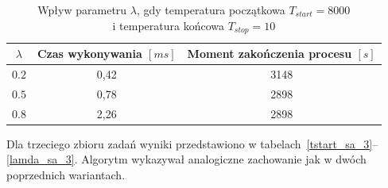 \begin{table}[H]
	\centering
	\caption{Wpływ parametru $\lambda$, gdy temperatura początkowa $T_{start}=8000$\\i temperatura końcowa $T_{stop}=10$}
	\label{lamda_sa_2}
	\begin{tabular}{ccc}
		\toprule
		$\lambda$ & Czas wykonywania $[ms]$ & Moment zakończenia procesu $[s]$ \\
		\midrule
		$0.2$     & 0,42                    & 3148                              \\
		$0.5$     & 0,78                    & 2898                              \\
		$0.8$     & 2,26                    & 2898                              \\
		\bottomrule
	\end{tabular}
\end{table}

\breakparagraph{}
Dla trzeciego zbioru zadań wyniki przedstawiono w tabelach~\ref{tstart_sa_3}--\ref{lamda_sa_3}. Algorytm wykazywał analogiczne zachowanie jak w dwóch poprzednich wariantach.

